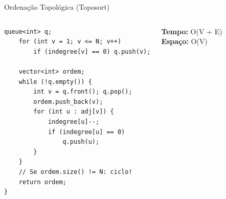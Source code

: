 \documentclass[aspectratio=169,10pt]{beamer}
\begin{document}
\begin{frame}[fragile]{Ordenação Topológica (Toposort)}
\begin{columns}[t]
\begin{tcolorbox}[caixaCodigo]
\begin{lstlisting}[style=cppsmall]
    queue<int> q;
    for (int v = 1; v <= N; v++)
        if (indegree[v] == 0) q.push(v);

    vector<int> ordem;
    while (!q.empty()) {
        int v = q.front(); q.pop();
        ordem.push_back(v);
        for (int u : adj[v]) {
            indegree[u]--;
            if (indegree[u] == 0)
                q.push(u);
        }
    }
    // Se ordem.size() != N: ciclo!
    return ordem;
}
        \end{lstlisting}
      \end{tcolorbox}
      \begin{tcolorbox}[caixaVerde,title={Complexidade}]
        \footnotesize
        \textbf{Tempo:} O(V + E)\\
        \textbf{Espaço:} O(V)
      \end{tcolorbox}
    \end{columns}
\end{frame}
\end{document}
